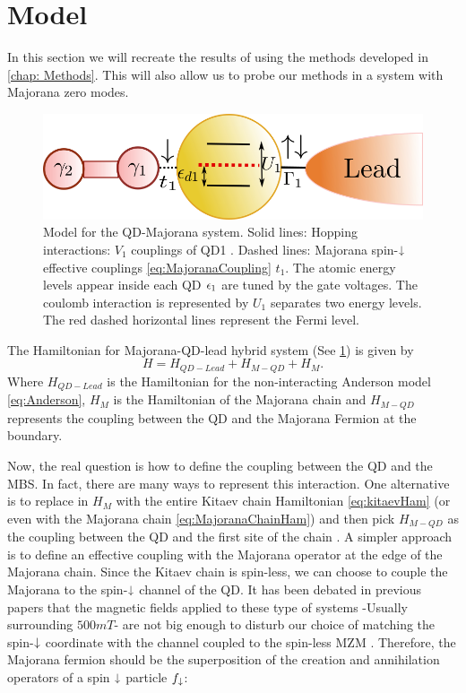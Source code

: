 \section{Model}

In this section we will recreate the results of \citeauthor{liu_detecting_2011} using the methods developed in \ref{chap: Methods}. This will also allow us to probe our methods in a system with Majorana zero modes. 

\begin{figure}[t]
    \centering
    \includegraphics[scale=0.6]{IMAGES/Majorana/QD-M.png}
    \caption{\label{fig:ModelM-QD} Model for the QD-Majorana system. Solid lines: Hopping interactions: $V_1$ couplings of QD1 . Dashed lines: Majorana spin-$\downarrow$ effective couplings \eqref{eq:MajoranaCoupling} $t_1$. The atomic energy levels appear inside each QD $\epsilon_1$ are tuned by the gate voltages. The coulomb interaction is represented by $U_1$ separates two energy levels.  The red dashed horizontal lines represent the Fermi level. }
\end{figure}

The Hamiltonian for Majorana-QD-lead hybrid system (See \ref{fig:ModelM-QD}) is  given by
\begin{equation}
    H=H_{QD-Lead}+H_{M-QD}+H_M.
\end{equation}
Where $H_{QD-Lead}$ is the Hamiltonian for the non-interacting Anderson model \eqref{eq:Anderson}, $H_M$ is the Hamiltonian of the Majorana chain and $H_{M-QD}$ represents the coupling between the QD and the Majorana Fermion at the boundary.

Now, the real question is how to define the coupling between the QD and the MBS. In fact, there are many ways to represent this interaction. One alternative is to replace in $H_{M}$ with the entire Kitaev chain Hamiltonian \eqref{eq:kitaevHam} (or  even with the  Majorana chain \eqref{eq:MajoranaChainHam}) and then pick $H_{M-QD}$ as the coupling between the QD and the first site of the chain \cite{vernek_subtle_2014}.  A simpler approach is  to define an effective coupling with the Majorana operator at the edge of the Majorana chain. Since the Kitaev chain is spin-less, we can choose to couple the Majorana to the spin-$\downarrow$ channel of the QD. It has been debated in previous papers that the magnetic fields applied to these type of systems -Usually surrounding $500mT$- are not big enough to disturb our choice of matching the spin-$\downarrow$ coordinate with the channel coupled to the spin-less MZM \cite{ruiz-tijerina_interaction_2015}. Therefore, the Majorana fermion should be the superposition of the creation and annihilation operators of a spin $\downarrow$ particle $f_\downarrow$:


